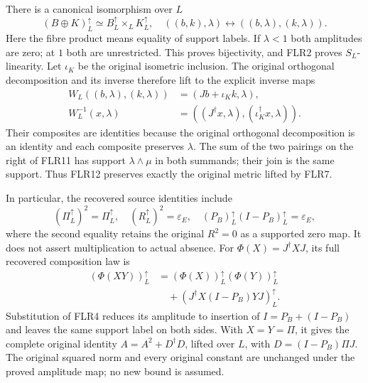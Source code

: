 \documentclass[11pt]{article}
\begin{document}
There is a canonical isomorphism over $L$
\[
(B\oplus K)_L^\uparrow
 \simeq B_L^\uparrow\times_L K_L^\uparrow,
\quad((b,k),\lambda)\longleftrightarrow((b,\lambda),(k,\lambda)).
\tag{FLR11}
\]
Here the fibre product means equality of support labels. If $\lambda<1$
both amplitudes are zero; at $1$ both are unrestricted. This proves
bijectivity, and FLR2 proves $S_L$-linearity. Let $\iota_K$ be the original
isometric inclusion. The original orthogonal decomposition and its inverse
therefore lift to the explicit inverse maps
\[
\begin{split}
W_L((b,\lambda),(k,\lambda))&=(Jb+\iota_Kk,\lambda),\\
W_L^{-1}(x,\lambda)&=((J^\dagger x,\lambda),
                          (\iota_K^\dagger x,\lambda)).
\end{split}
\tag{FLR12}
\]
Their composites are identities because the original orthogonal
decomposition is an identity and each composite preserves $\lambda$.
The sum of the two pairings on the right of FLR11 has support
$\lambda\wedge\mu$ in both summands; their join is the same support.
Thus FLR12 preserves exactly the original metric lifted by FLR7.

In particular, the recovered source identities include
\[
(\Pi_L^\uparrow)^2=\Pi_L^\uparrow,\quad
(R_L^\uparrow)^2=\varepsilon_E,\quad
(P_B)_L^\uparrow(I-P_B)_L^\uparrow=\varepsilon_E,
\tag{FLR13}
\]
where the second equality retains the original $R^2=0$ as a supported
zero map. It does not assert multiplication to actual absence.
For $\Phi(X)=J^\dagger XJ$, its full recovered composition law is
\[
\begin{split}
(\Phi(XY))_L^\uparrow
 &=(\Phi(X))_L^\uparrow(\Phi(Y))_L^\uparrow\\
 &\quad+
  (J^\dagger X(I-P_B)YJ)_L^\uparrow.
\end{split}
\tag{FLR14}
\]
Substitution of FLR4 reduces its amplitude to insertion of
$I=P_B+(I-P_B)$ and leaves the same support label on both sides.
With $X=Y=\Pi$, it gives the complete original identity
$A=A^2+D^\dagger D$, lifted over $L$, with
$D=(I-P_B)\Pi J$. The original squared norm and every original constant
are unchanged under the proved amplitude map; no new bound is assumed.
\end{document}
